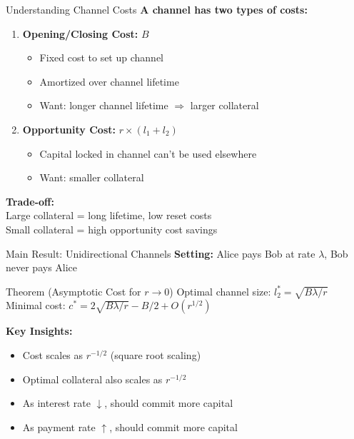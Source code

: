 \documentclass[aspectratio=169,12pt]{beamer}
\begin{document}
\begin{frame}{Understanding Channel Costs}
\textbf{A channel has two types of costs:}

\begin{enumerate}
    \item \textbf{Opening/Closing Cost:} $B$
    \begin{itemize}
        \item Fixed cost to set up channel
        \item Amortized over channel lifetime
        \item Want: longer channel lifetime $\Rightarrow$ larger collateral
    \end{itemize}
    
    \vspace{0.3cm}
    \item \textbf{Opportunity Cost:} $r \times (l_1 + l_2)$
    \begin{itemize}
        \item Capital locked in channel can't be used elsewhere
        \item Want: smaller collateral
    \end{itemize}
\end{enumerate}

\vspace{0.5cm}
\begin{center}
\textbf{Trade-off:} \\
Large collateral = long lifetime, low reset costs \\
Small collateral = high opportunity cost savings
\end{center}
\end{frame}

\begin{frame}{Main Result: Unidirectional Channels}
\textbf{Setting:} Alice pays Bob at rate $\lambda$, Bob never pays Alice

\begin{block}{Theorem (Asymptotic Cost for $r \to 0$)}
Optimal channel size: $l_2^* = \sqrt{B\lambda/r}$ \\[0.2cm]
Minimal cost: $c^* = 2\sqrt{B\lambda/r} - B/2 + O(r^{1/2})$
\end{block}

\textbf{Key Insights:}
\begin{itemize}
    \item Cost scales as $\boxed{r^{-1/2}}$ (square root scaling)
    \item Optimal collateral also scales as $r^{-1/2}$
    \item As interest rate $\downarrow$, should commit more capital
    \item As payment rate $\uparrow$, should commit more capital
\end{itemize}

\end{frame}
\end{document}
